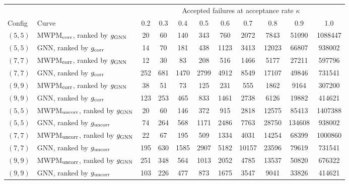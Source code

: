 \begin{tabular}{ll| c c c c c c c c c}
\toprule
 & & \multicolumn{9}{c}{Accepted failures at acceptance rate $\kappa$} \\
Config & Curve & 0.2 & 0.3 & 0.4 & 0.5 & 0.6 & 0.7 & 0.8 & 0.9 & 1.0 \\
\hline
\midrule
$(5, 5)$ & MWPM$_{\rm corr}$, ranked by $g_{\rm GNN}$ & 20 & 60 & 140 & 343 & 760 & 2072 & 7843 & 51090 & 1088447 \\
$(5, 5)$ & GNN, ranked by $g_{\rm corr}$ & 14 & 70 & 181 & 438 & 1123 & 3413 & 12023 & 66807 & 938002 \\
$(7, 7)$ & MWPM$_{\rm corr}$, ranked by $g_{\rm GNN}$ & 12 & 30 & 83 & 208 & 516 & 1466 & 5177 & 27211 & 597796 \\
$(7, 7)$ & GNN, ranked by $g_{\rm corr}$ & 252 & 681 & 1470 & 2799 & 4912 & 8549 & 17107 & 49846 & 731541 \\
$(9, 9)$ & MWPM$_{\rm corr}$, ranked by $g_{\rm GNN}$ & 38 & 51 & 73 & 125 & 231 & 555 & 1862 & 9164 & 307200 \\
$(9, 9)$ & GNN, ranked by $g_{\rm corr}$ & 123 & 253 & 465 & 833 & 1461 & 2738 & 6126 & 19882 & 414621 \\
\hline
$(5, 5)$ & MWPM$_{\rm uncorr}$, ranked by $g_{\rm GNN}$ & 20 & 60 & 146 & 372 & 915 & 2818 & 12575 & 85413 & 1407388 \\
$(5, 5)$ & GNN, ranked by $g_{\rm uncorr}$ & 74 & 264 & 568 & 1171 & 2486 & 7763 & 28750 & 134608 & 938002 \\
$(7, 7)$ & MWPM$_{\rm uncorr}$, ranked by $g_{\rm GNN}$ & 22 & 67 & 195 & 509 & 1334 & 4031 & 14254 & 68399 & 1000860 \\
$(7, 7)$ & GNN, ranked by $g_{\rm uncorr}$ & 195 & 630 & 1585 & 2907 & 5182 & 10157 & 23596 & 79619 & 731541 \\
$(9, 9)$ & MWPM$_{\rm uncorr}$, ranked by $g_{\rm GNN}$ & 251 & 348 & 564 & 1013 & 2052 & 4785 & 13537 & 50820 & 676322 \\
$(9, 9)$ & GNN, ranked by $g_{\rm uncorr}$ & 103 & 226 & 477 & 873 & 1675 & 3547 & 9041 & 33826 & 414621 \\
\bottomrule
\end{tabular}
